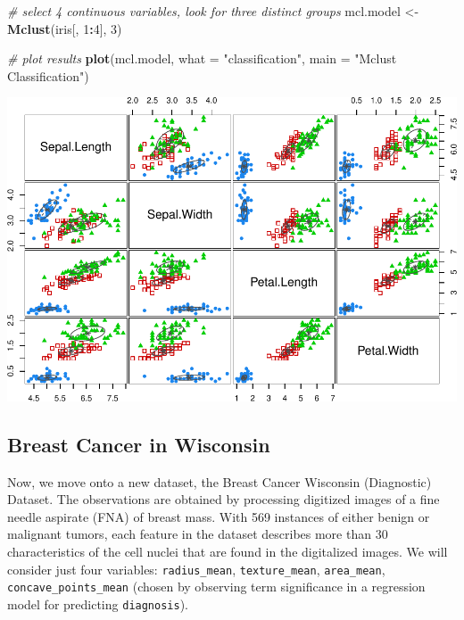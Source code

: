 \documentclass[12pt]{article}
\newenvironment{Shaded}{\begin{snugshade}}{\end{snugshade}}
\newcommand{\AttributeTok}[1]{\textcolor[rgb]{0.13,0.29,0.53}{#1}}
\newcommand{\CommentTok}[1]{\textcolor[rgb]{0.56,0.35,0.01}{\textit{#1}}}
\newcommand{\DecValTok}[1]{\textcolor[rgb]{0.00,0.00,0.81}{#1}}
\newcommand{\FunctionTok}[1]{\textcolor[rgb]{0.13,0.29,0.53}{\textbf{#1}}}
\newcommand{\NormalTok}[1]{#1}
\newcommand{\OtherTok}[1]{\textcolor[rgb]{0.56,0.35,0.01}{#1}}
\newcommand{\SpecialCharTok}[1]{\textcolor[rgb]{0.81,0.36,0.00}{\textbf{#1}}}
\newcommand{\StringTok}[1]{\textcolor[rgb]{0.31,0.60,0.02}{#1}}
\begin{document}
\begin{Shaded}
\begin{Highlighting}[]
\CommentTok{\# select 4 continuous variables, look for three distinct groups}
\NormalTok{mcl.model }\OtherTok{\textless{}{-}} \FunctionTok{Mclust}\NormalTok{(iris[, }\DecValTok{1}\SpecialCharTok{:}\DecValTok{4}\NormalTok{], }\DecValTok{3}\NormalTok{)}

\CommentTok{\# plot results}
\FunctionTok{plot}\NormalTok{(mcl.model, }\AttributeTok{what =} \StringTok{"classification"}\NormalTok{, }\AttributeTok{main =} \StringTok{"Mclust Classification"}\NormalTok{)}
\end{Highlighting}
\end{Shaded}

\includegraphics{ProjectDraftForPeer_files/figure-latex/unnamed-chunk-5-3.pdf}

\hypertarget{breast-cancer-in-wisconsin}{%
\subsection{Breast Cancer in
Wisconsin}\label{breast-cancer-in-wisconsin}}

Now, we move onto a new dataset, the Breast Cancer Wisconsin
(Diagnostic) Dataset. The observations are obtained by processing
digitized images of a fine needle aspirate (FNA) of breast mass. With
569 instances of either benign or malignant tumors, each feature in the
dataset describes more than 30 characteristics of the cell nuclei that
are found in the digitalized images. We will consider just four
variables: \texttt{radius\_mean}, \texttt{texture\_mean},
\texttt{area\_mean}, \texttt{concave\_points\_mean} (chosen by observing
term significance in a regression model for predicting
\texttt{diagnosis}).
\end{document}
